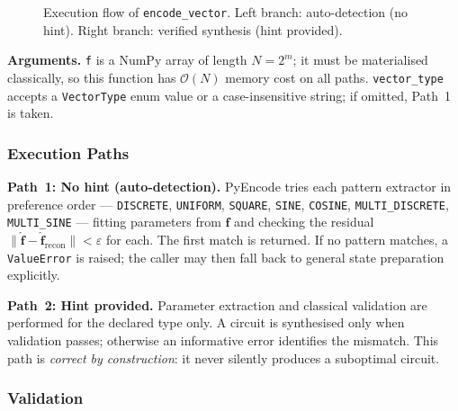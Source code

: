 \documentclass[10pt,twocolumn]{article}
\newcommand{\bigO}[1]{\mathcal{O}(#1)}
\begin{document}
\begin{figure}[ht]
\caption{Execution flow of \texttt{encode\_vector}.
         Left branch: auto-detection (no hint).
         Right branch: verified synthesis (hint provided).}
\label{fig:encode_vector_flow}
\end{figure}

\noindent\textbf{Arguments.}
\texttt{f} is a NumPy array of length $N = 2^m$; it must
be materialised classically, so this function has
$\bigO{N}$ memory cost on all paths. \texttt{vector\_type}
accepts a \texttt{VectorType} enum value or a
case-insensitive string; if omitted, Path~1 is taken.

\subsubsection*{Execution Paths}

\textbf{Path~1: No hint (auto-detection).}
PyEncode tries each pattern extractor in preference
order --- \texttt{DISCRETE}, \texttt{UNIFORM},
\texttt{SQUARE}, \texttt{SINE}, \texttt{COSINE},
\texttt{MULTI\_DISCRETE}, \texttt{MULTI\_SINE} ---
fitting parameters from $\mathbf{f}$ and checking the
residual $\|\hat{\mathbf{f}}-\hat{\mathbf{f}}_\mathrm{recon}\|
< \varepsilon$ for each. The first match is returned.
If no pattern matches, a \texttt{ValueError} is raised;
the caller may then fall back to general state
preparation explicitly.

\textbf{Path~2: Hint provided.}
Parameter extraction and classical validation are
performed for the declared type only. A circuit is
synthesised only when validation passes; otherwise an
informative error identifies the mismatch. This path
is \emph{correct by construction}: it never silently
produces a suboptimal circuit.

\subsubsection*{Validation}
\end{document}
